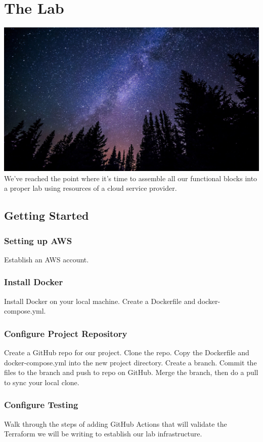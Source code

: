 \chapter{The Lab}

\includegraphics[scale=0.20]{../images/milky-way-984050_1920.jpg}
\justify{}
We've reached the point where it's time to assemble all our functional
blocks into a proper lab using resources of a cloud service provider.

\section{Getting Started}

\subsection{Setting up AWS}
\justify{}
Establish an AWS account.

\subsection{Install Docker}
\justify{}
Install Docker on your local machine. Create a Dockerfile and
docker-compose.yml.

\subsection{Configure Project Repository}
\justify{}
Create a GitHub repo for our project. Clone the repo. Copy the
Dockerfile and docker-compose.yml into the new project directory. Create
a branch. Commit the files to the branch and push to repo on GitHub.
Merge the branch, then do a pull to sync your local clone.

\subsection{Configure Testing}
\justify{}
Walk through the steps of adding GitHub Actions that will validate the
Terraform we will be writing to establish our lab infrastructure.

